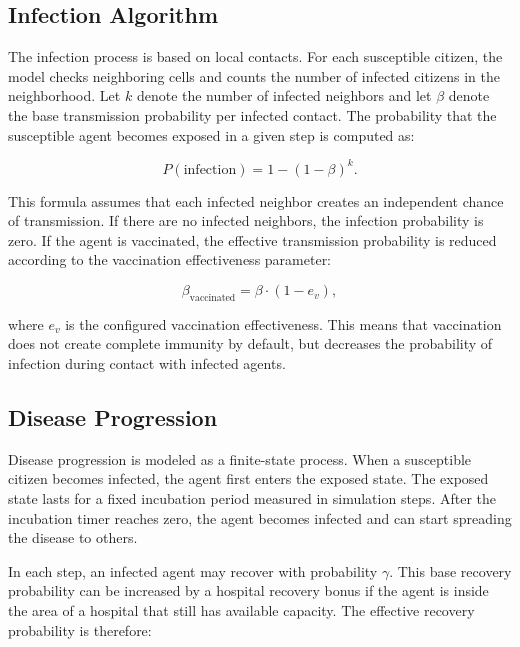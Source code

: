 \documentclass[english]{projectreport}
\begin{document}
\subsection{Infection Algorithm}
\label{sec:solution-infection}

The infection process is based on local contacts. For each susceptible
citizen, the model checks neighboring cells and counts the number of
infected citizens in the neighborhood. Let $k$ denote the number of
infected neighbors and let $\beta$ denote the base transmission
probability per infected contact. The probability that the susceptible
agent becomes exposed in a given step is computed as:

\begin{equation}
P(\mathrm{infection}) = 1 - (1 - \beta)^k.
\end{equation}

This formula assumes that each infected neighbor creates an independent
chance of transmission. If there are no infected neighbors, the infection
probability is zero. If the agent is vaccinated, the effective
transmission probability is reduced according to the vaccination
effectiveness parameter:

\begin{equation}
\beta_{\mathrm{vaccinated}} = \beta \cdot (1 - e_v),
\end{equation}

where $e_v$ is the configured vaccination effectiveness. This means that
vaccination does not create complete immunity by default, but decreases
the probability of infection during contact with infected agents.

\subsection{Disease Progression}
\label{sec:solution-disease-progression}

Disease progression is modeled as a finite-state process. When a
susceptible citizen becomes infected, the agent first enters the exposed
state. The exposed state lasts for a fixed incubation period measured in
simulation steps. After the incubation timer reaches zero, the agent
becomes infected and can start spreading the disease to others.

In each step, an infected agent may recover with probability $\gamma$.
This base recovery probability can be increased by a hospital recovery
bonus if the agent is inside the area of a hospital that still has
available capacity. The effective recovery probability is therefore:
\end{document}
